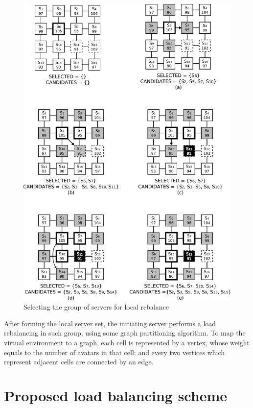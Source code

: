 \begin{figure}
 \centering
 \includegraphics[width=1.04\textwidth]{images/localselection}
 \caption{Selecting the group of servers for local rebalance}
 \label{fig:lee2}
\end{figure}

After forming the local server set, the initiating server performs a load rebalancing in such group, using some graph partitioning algorithm. To map the virtual environment to a graph, each cell is represented by a vertex, whose weight equals to the number of avatars in that cell; and every two vertices which represent adjacent cells are connected by an edge.



\section{Proposed load balancing scheme}
\label{sec:scheme}

